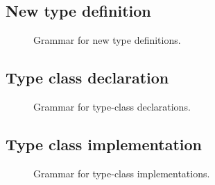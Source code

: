 \subsection{New type definition}\label{subsec:zilch-grammar-declarations-type}

\begin{figure}[H]
  \centering


  \caption{Grammar for new type definitions.}
  \label{fig:zilch-grammar-declarations-type-grammar}
\end{figure}

\subsection{Type class declaration}\label{subsec:zilch-grammar-declarations-typeclass}

\begin{figure}[H]
  \centering


  \caption{Grammar for type-class declarations.}
  \label{fig:zilch-grammar-declarations-typeclass-grammar}
\end{figure}

\subsection{Type class implementation}\label{subsec:zilch-grammar-declarations-implementation}

\begin{figure}[H]
  \centering


  \caption{Grammar for type-class implementations.}
  \label{fig:zilch-grammar-declarations-implementation-grammar}
\end{figure}
